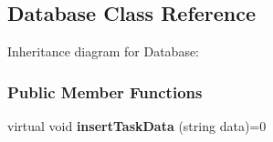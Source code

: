 \hypertarget{a00010}{}\subsection{Database Class Reference}
\label{a00010}


Inheritance diagram for Database\+:
\subsubsection*{Public Member Functions}
\begin{DoxyCompactItemize}
\item 
\hypertarget{a00010_aa80c3dd72d5b120a148ef31ccc7430b6}{}virtual void {\bfseries insert\+Task\+Data} (string data)=0\label{a00010_aa80c3dd72d5b120a148ef31ccc7430b6}

\end{DoxyCompactItemize}
